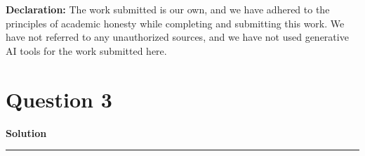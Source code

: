 \documentclass[a4paper,12pt]{article}
\title{\cooltitle{CS754 Assignment-3}}
\author{{\bf Saksham Rathi, Ekansh Ravi Shankar, Kshitij Vaidya}}
\date{}
\newenvironment{solution}[2][]{%
    \begin{mdframed}[linecolor=blue!70!black, linewidth=2pt, roundcorner=10pt, backgroundcolor=yellow!10!white, skipabove=12pt, skipbelow=12pt]%
        \textbf{\large #2}
        \par\noindent\rule{\textwidth}{0.4pt}
}{
    \end{mdframed}
}
\begin{document}
\maketitle
\textbf{Declaration:} The work submitted is our own, and
we have adhered to the principles of academic honesty while completing and submitting this work. We have not referred to any unauthorized sources, and we have not used generative AI tools for the work submitted here.

\section*{Question 3}

\begin{solution}{Solution}
 

\end{solution}
\end{document}
